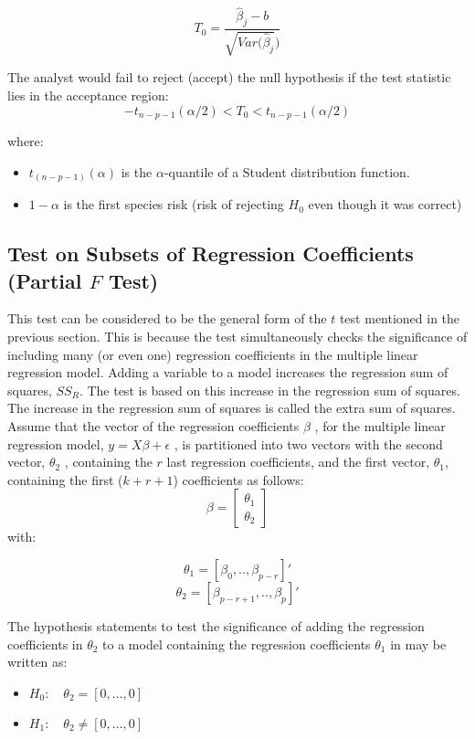 \documentclass[a4paper]{article}
\theoremstyle{plain}
\begin{document}
$$ T_0 = \frac{\hat \beta_j - b}{\sqrt{Var(\hat \beta_j})}$$

The analyst would fail to reject (accept) the null hypothesis if the test statistic lies in the acceptance region: 
$$ -t_{n-p-1}(\alpha/2)< T_0 < t_{n-p-1}(\alpha/2) $$

where:
\begin{itemize}
\item $t_{(n-p-1)}(\alpha)$ is the $\alpha$-quantile of a Student distribution function.
\item $1- \alpha$ is the first species risk (risk of rejecting $H_0$ even though it was correct)
\end{itemize}

\subsection{Test on Subsets of Regression Coefficients (Partial $F$ Test)}

This test can be considered to be the general form of the $t$ test mentioned in the previous section. This is because the test simultaneously checks the significance of including many (or even one) regression coefficients in the multiple linear regression model. Adding a variable to a model increases the regression sum of squares, $SS_R$. The test is based on this increase in the regression sum of squares. The increase in the regression sum of squares is called the extra sum of squares. Assume that the vector of the regression coefficients $\beta$ , for the multiple linear regression model, $y= X\beta + \epsilon$ , is partitioned into two vectors with the second vector, $\theta_2$ , containing the $r$ last regression coefficients, and the first vector, $\theta_1$, containing the first ($k+r+1$) coefficients as follows: 
$$ \beta =  
\begin{bmatrix}
\theta_1 \\
\theta_2
\end{bmatrix} 
$$
with:

$$ \theta_1 = [\beta_0, .. ,\beta_{p-r}]'$$
$$ \theta_2 = [\beta_{p-r+1}, .. ,\beta_{p}]'$$

The hypothesis statements to test the significance of adding the regression coefficients in $\theta_2$ to a model containing the regression coefficients $\theta_1$ in may be written as: 

\begin{itemize}
\item $H_0: \quad \theta_2 = [0,...,0]$
\item $H_1: \quad \theta_2 \neq [0,...,0]$ 
\end{itemize}
\end{document}
